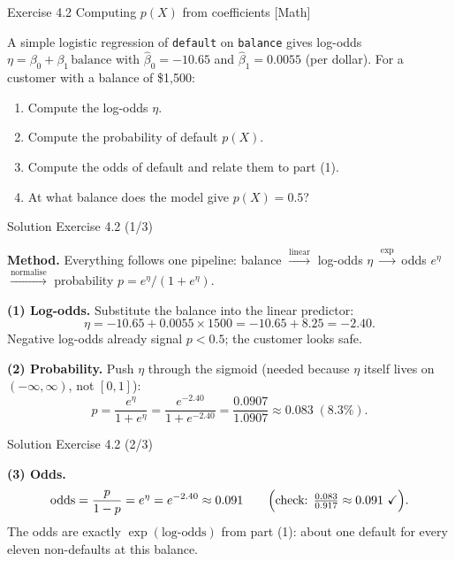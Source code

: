 \documentclass[aspectratio=169,11pt]{beamer}
\begin{document}
\begin{frame}{Exercise 4.2 \textemdash{} Computing $p(X)$ from coefficients [Math]}
\begin{exercise}
A simple logistic regression of \texttt{default} on \texttt{balance}
gives log-odds $\eta = \beta_0 + \beta_1\,\text{balance}$ with
$\hat\beta_0 = -10.65$ and $\hat\beta_1 = 0.0055$ (per dollar).
For a customer with a balance of \$1{,}500:
\begin{enumerate}
  \item Compute the log-odds $\eta$.
  \item Compute the probability of default $p(X)$.
  \item Compute the odds of default and relate them to part (1).
  \item At what balance does the model give $p(X)=0.5$?
\end{enumerate}
\end{exercise}
\end{frame}

\begin{frame}{Solution \textemdash{} Exercise 4.2 (1/3)}
\begin{solutionbox}
\textbf{Method.} Everything follows one pipeline:
balance $\xrightarrow{\text{linear}}$ log-odds $\eta$
$\xrightarrow{\exp}$ odds $e^{\eta}$
$\xrightarrow{\text{normalise}}$ probability
$p=e^{\eta}/(1+e^{\eta})$.

\vspace{1mm}
\textbf{(1) Log-odds.} Substitute the balance into the linear predictor:
\[
  \eta = -10.65 + 0.0055 \times 1500 = -10.65 + 8.25 = -2.40 .
\]
Negative log-odds already signal $p<0.5$; the customer looks safe.

\vspace{1mm}
\textbf{(2) Probability.} Push $\eta$ through the sigmoid
(needed because $\eta$ itself lives on $(-\infty,\infty)$, not $[0,1]$):
\[
  p = \frac{e^{\eta}}{1+e^{\eta}} = \frac{e^{-2.40}}{1+e^{-2.40}}
    = \frac{0.0907}{1.0907} \approx 0.083 \;(8.3\%).
\]
\end{solutionbox}
\end{frame}

\begin{frame}{Solution \textemdash{} Exercise 4.2 (2/3)}
\begin{solutionbox}
\textbf{(3) Odds.}
\[
  \text{odds} = \frac{p}{1-p} = e^{\eta} = e^{-2.40} \approx 0.091
  \qquad\Bigl(\text{check: } \tfrac{0.083}{0.917}\approx 0.091\ \checkmark\Bigr).
\]
The odds are exactly $\exp(\text{log-odds})$ from part (1): about one
default for every eleven non-defaults at this balance.

\vspace{1mm}
\end{solutionbox}
\end{frame}
\end{document}

